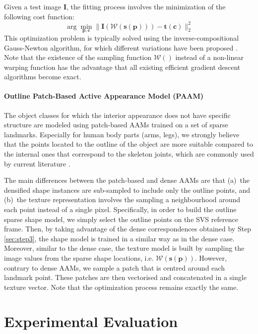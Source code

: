 Given a test image $\mathbf{I}$, the fitting process involves the minimization of the following cost function:
\begin{equation}
    \arg\min_{\bm{p}, \bm{c}}\|\bm{I}(\mathcal{W}(\bm{s}(\bm{p}))) - \bm{t}(\bm{c})\|_2^2
	\label{eq:aam_cost}
\end{equation}
This optimization problem is typically solved using the inverse-compositional Gauss-Newton algorithm, for which different variations have been proposed \cite{Matthews2004, Papandreou2008, Amberg2009, Tzimiropoulos2013, Alabort2014}. Note that the existence of the sampling function $\mathcal{W}()$ instead of a non-linear warping function has the advantage that all existing efficient gradient descent algorithms become exact.

\paragraph{Outline Patch-Based Active Appearance Model (PAAM)} The object classes for which the interior appearance does not have specific structure are modeled using patch-based AAMs \cite{Tzimiropoulos2014} trained on a set of sparse landmarks. Especially for human body parts (arms, legs), we strongly believe that the points located to the outline of the object are more suitable compared to the internal ones that correspond to the skeleton joints, which are commonly used by current literature \cite{buehler2011upper,charles2013domain,pfister2015flowing,yang2013articulated}.

The main differences between the patch-based and dense AAMs are that (a)~the densified shape instances are sub-sampled to include only the outline points, and (b)~the texture representation involves the sampling a neighbourhood around each point instead of a single pixel. Specifically, in order to build the outline sparse shape model, we simply select the outline points on the SVS reference frame. Then, by taking advantage of the dense correspondences obtained by Step \ref{sec:step3}, the shape model is trained in a similar way as in the dense case. Moreover, similar to the dense case, the texture model is built by sampling the image values from the sparse shape locations, i.e. $\mathcal{W}(\bm{s}(\bm{p}))$. However, contrary to dense AAMs, we sample a patch that is centred around each landmark point. These patches are then vectorised and concatenated in a single texture vector. Note that the optimization process remains exactly the same.


\section{Experimental Evaluation}

